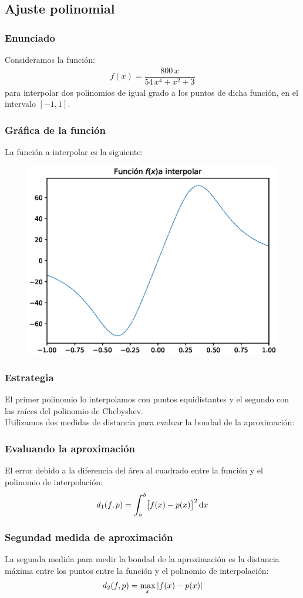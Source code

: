 \documentclass[12pt]{beamer}
\begin{document}
\subsection{Ajuste polinomial}

\begin{frame}
\frametitle{Enunciado}
Consideramos la función:
\begin{align*}
f (x) = \dfrac{800 \, x}{54 \, x^{4} + x^{2} + 3}
\end{align*}
para interpolar dos polinomios de igual grado a los puntos de dicha función, en el intervalo $[-1, 1]$.
\end{frame}
\begin{frame}
\frametitle{Gráfica de la función}
La función a interpolar es la siguiente:
\begin{figure}
    \centering
    \includegraphics[scale=0.5]{Imagenes/Plot_Ejercicio_Chebychev_01.eps}
\end{figure}
\end{frame}
\begin{frame}
\frametitle{Estrategia} 
El primer polinomio lo interpolamos con puntos equidistantes y el segundo con las raíces del polinomio de Chebyshev.
\\
\bigskip
\pause
Utilizamos dos medidas de distancia para evaluar la bondad de la aproximación:
\end{frame}
\begin{frame}
\frametitle{Evaluando la aproximación}
El error debido a la diferencia del área al cuadrado entre la función y el polinomio de interpolación:
\pause
\begin{align*}
d_{1} (f, p) = \scaleint{6ex}_{\bs a}^{b} \big[ f(x) - p(x) \big]^{2} \dd{x}
\end{align*}
\end{frame}
\begin{frame}
\frametitle{Segundad medida de aproximación}
La segunda medida para medir la bondad de la aproximación es la distancia máxima entre los puntos entre la función y el polinomio de interpolación:
\pause
\begin{align*}
d_{2} (f, p) = \max_{x} \abs{f(x) - p(x)}
\end{align*}
\end{frame}
\end{document}
